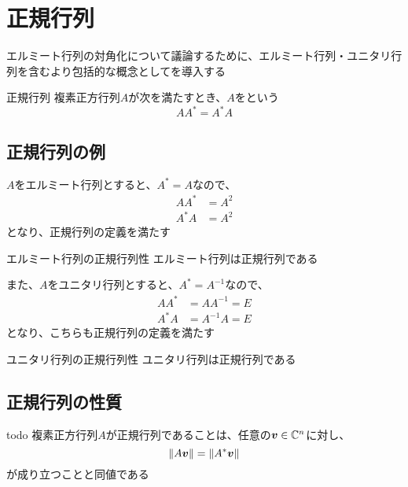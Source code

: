 \documentclass[../../../topic_linear-algebra]{subfiles}
\begin{document}
\sectionline
\section{正規行列}

エルミート行列の対角化について議論するために、エルミート行列・ユニタリ行列を含むより包括的な概念としてを導入する

\begin{definition}{正規行列}
  複素正方行列$A$が次を満たすとき、$A$をという
  \begin{equation*}
    A A^* = A^* A
  \end{equation*}
\end{definition}

\subsection{正規行列の例}

$A$をエルミート行列とすると、$A^* = A$なので、
\begin{align*}
  A A^* & = A^2 \\
  A^* A & = A^2
\end{align*}
となり、正規行列の定義を満たす

\begin{theorem}{エルミート行列の正規行列性}
  エルミート行列は正規行列である
\end{theorem}

\br

また、$A$をユニタリ行列とすると、$A^* = A^{-1}$なので、
\begin{align*}
  A A^* & = A A^{-1} = E \\
  A^* A & = A^{-1} A = E
\end{align*}
となり、こちらも正規行列の定義を満たす

\begin{theorem}{ユニタリ行列の正規行列性}
  ユニタリ行列は正規行列である
\end{theorem}

\subsection{正規行列の性質}

\begin{theorem}{todo}
  複素正方行列$A$が正規行列であることは、任意の$\vb*{v} \in \mathbb{C}^n$に対し、
  \begin{equation*}
    \|A\vb*{v}\| = \|A^*\vb*{v}\|
  \end{equation*}
  が成り立つことと同値である
\end{theorem}
\end{document}
